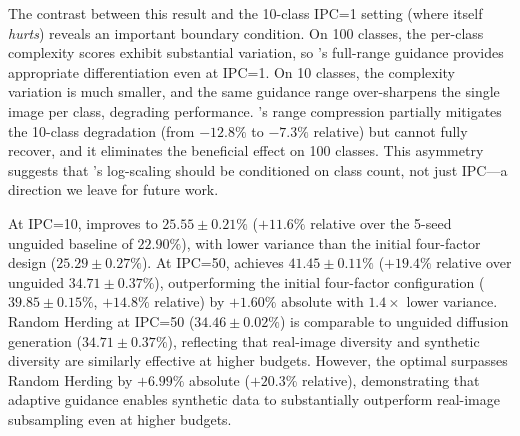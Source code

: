 The contrast between this result and the 10-class IPC=1 setting (where \cags{} itself \emph{hurts}) reveals an important boundary condition. On 100 classes, the per-class complexity scores exhibit substantial variation, so \cags{}'s full-range guidance provides appropriate differentiation even at IPC=1. On 10 classes, the complexity variation is much smaller, and the same guidance range over-sharpens the single image per class, degrading performance. \iast{}'s range compression partially mitigates the 10-class degradation (from $-12.8\%$ to $-7.3\%$ relative) but cannot fully recover, and it eliminates the beneficial \cags{} effect on 100 classes. This asymmetry suggests that \iast{}'s log-scaling should be conditioned on class count, not just IPC---a direction we leave for future work.

At IPC=10, \cags{} improves to $25.55 \pm 0.21\%$ ($+11.6\%$ relative over the 5-seed unguided baseline of $22.90\%$), with lower variance than the initial four-factor design ($25.29 \pm 0.27\%$). At IPC=50, \cags{} achieves $41.45 \pm 0.11\%$ ($+19.4\%$ relative over unguided $34.71 \pm 0.37\%$), outperforming the initial four-factor configuration ($39.85 \pm 0.15\%$, $+14.8\%$ relative) by $+1.60\%$ absolute with $1.4\times$ lower variance. Random Herding at IPC=50 ($34.46 \pm 0.02\%$) is comparable to unguided diffusion generation ($34.71 \pm 0.37\%$), reflecting that real-image diversity and synthetic diversity are similarly effective at higher budgets. However, the optimal \cags{} surpasses Random Herding by $+6.99\%$ absolute ($+20.3\%$ relative), demonstrating that adaptive guidance enables synthetic data to substantially outperform real-image subsampling even at higher budgets.

